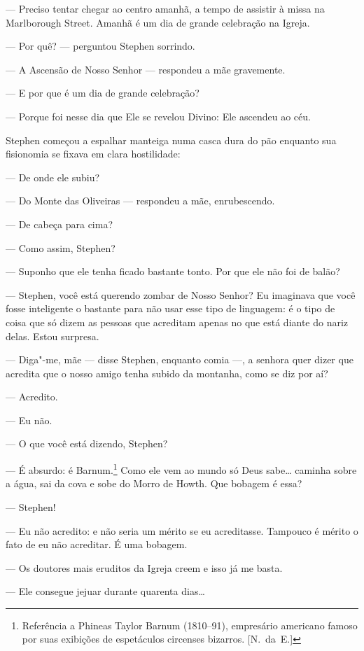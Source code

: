 --- Preciso tentar chegar ao centro amanhã, a tempo de assistir à missa na
Marlborough Street.  Amanhã é um dia de grande celebração na Igreja.

--- Por quê? --- perguntou Stephen sorrindo.

--- A Ascensão de Nosso Senhor --- respondeu a mãe gravemente.

--- E por que é um dia de grande celebração?

--- Porque foi nesse dia que Ele se revelou Divino: Ele ascendeu ao céu.

Stephen começou a espalhar manteiga numa casca dura do pão enquanto sua
fisionomia se fixava em clara hostilidade:

--- De onde ele subiu?

--- Do Monte das Oliveiras --- respondeu a mãe, enrubescendo.

--- De cabeça para cima?

--- Como assim, Stephen?

--- Suponho que ele tenha ficado bastante tonto.  Por que ele não foi de balão?

--- Stephen, você está querendo zombar de Nosso Senhor?  Eu imaginava que você
fosse inteligente o bastante para não usar esse tipo de linguagem: é o tipo de
coisa que só dizem as pessoas que acreditam apenas no que está diante do nariz
delas.  Estou surpresa.

--- Diga"-me, mãe --- disse Stephen, enquanto comia ---, a senhora quer dizer
que acredita que o nosso amigo tenha subido da montanha, como se diz por aí?

--- Acredito.

--- Eu não.

--- O que você está dizendo, Stephen?

--- É absurdo: é Barnum.\footnote{ Referência a Phineas Taylor Barnum (1810--91), empresário americano
famoso por suas exibições de espetáculos circenses bizarros. [N.~da~E.]}  
Como ele vem ao mundo só Deus sabe\ldots{}  caminha sobre
a água, sai da cova e sobe do Morro de Howth.  Que bobagem é essa?

--- Stephen!

--- Eu não acredito: e não seria um mérito se eu acreditasse.  Tampouco é
mérito o fato de eu não acreditar.  É uma bobagem.

--- Os doutores mais eruditos da Igreja creem e isso já me basta.

--- Ele consegue jejuar durante quarenta dias\ldots{}

